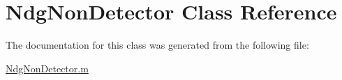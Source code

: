 \hypertarget{class_ndg_non_detector}{}\section{Ndg\+Non\+Detector Class Reference}
\label{class_ndg_non_detector}


The documentation for this class was generated from the following file\+:\begin{DoxyCompactItemize}
\item 
\hyperlink{_ndg_non_detector_8m}{Ndg\+Non\+Detector.\+m}\end{DoxyCompactItemize}
